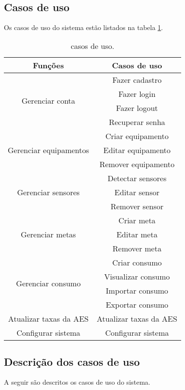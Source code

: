 \subsection{Casos de uso}

Os casos de uso do sistema estão listados na tabela \ref{tab:casos_de_uso}.

\begin{table}
\centering
{\renewcommand{\arraystretch}{1.5}
\renewcommand{\tabcolsep}{0.2cm}
\begin{tabular}{|c|c|}
\hline
\textbf{Funções} & \textbf{Casos de uso} \\
\hline
\multirow{4}{*}{Gerenciar conta} & Fazer cadastro\\
& Fazer login\\
& Fazer logout\\
& Recuperar senha\\
\hline
\multirow{3}{*}{Gerenciar equipamentos} & Criar equipamento\\
& Editar equipamento\\
& Remover equipamento\\
\hline
\multirow{3}{*}{Gerenciar sensores} & Detectar sensores\\
& Editar sensor\\
& Remover sensor\\
\hline
\multirow{3}{*}{Gerenciar metas} & Criar meta\\
& Editar meta\\
& Remover meta\\
\hline
\multirow{4}{*}{Gerenciar consumo} & Criar consumo\\
& Visualizar consumo\\
& Importar consumo\\
& Exportar consumo\\
\hline
Atualizar taxas da AES & Atualizar taxas da AES\\
\hline
Configurar sistema & Configurar sistema\\
\hline
\end{tabular}}
\caption{\label{tab:casos_de_uso} casos de uso.}
\end{table}
%
\subsection{Descrição dos casos de uso}

A seguir são descritos os casos de uso do sistema. 


